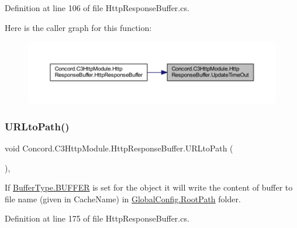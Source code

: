 Definition at line 106 of file Http\+Response\+Buffer.\+cs.

Here is the caller graph for this function\+:
\nopagebreak
\begin{figure}[H]
\begin{center}
\leavevmode
\includegraphics[width=350pt]{class_concord_1_1_c3_http_module_1_1_http_response_buffer_a29b2c2d2262cb331fe0f18e1dd930b5e_icgraph}
\end{center}
\end{figure}
\mbox{\label{class_concord_1_1_c3_http_module_1_1_http_response_buffer_afa05ddc467a347089e0e0f5d7dea8a4c}} 
\subsubsection{\texorpdfstring{URLtoPath()}{URLtoPath()}}
{\footnotesize\ttfamily void Concord.\+C3\+Http\+Module.\+Http\+Response\+Buffer.\+U\+R\+Lto\+Path (\begin{DoxyParamCaption}{ }\end{DoxyParamCaption})\hspace{0.3cm}{\ttfamily [inline]}, {\ttfamily [private]}}



If \mbox{\hyperlink{class_concord_1_1_c3_http_module_1_1_http_response_buffer_a34a310395d4f4472b24cf6da3fc3ab82a17de626bcae5109bb2f7a66dfc4a8a1d}{Buffer\+Type.\+B\+U\+F\+F\+ER}} is set for the object it will write the content of buffer to file name (given in Cache\+Name) in \mbox{\hyperlink{class_concord_1_1_c3_http_module_1_1_global_config_a21a3589b22cff498ecd2828fdecf1213}{Global\+Config.\+Root\+Path}} folder. 



Definition at line 175 of file Http\+Response\+Buffer.\+cs.

